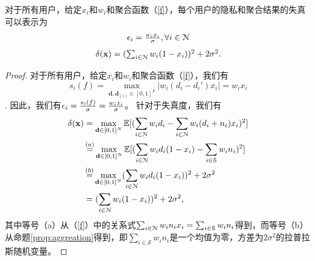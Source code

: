 	\begin{pp}[隐私-失真度]\label{prop:distortion}
		对于所有用户，给定$x_i$和$w_i$和聚合函数（\ref{f}），每个用户的隐私和聚合结果的失真可以表示为
		\begin{equation}\label{eq:e}
		\begin{array}
		[c]{lll}%
		\e_i=\frac{w_ix_i}{\sigma}, \forall i\in\N
		\end{array}
		\end{equation}
		\begin{equation}\label{eq:delta}
		\begin{array}
		[c]{lll}%
		\delta(\mathbf{x})=(\sum_{i\in\N}w_i(1-x_i))^2+2\sigma^2.
		\end{array}
		\end{equation}
	\end{pp}
	\begin{proof}
		对于所有用户，给定$x_i$和$w_i$和聚合函数（\ref{f}），我们有
		\[s_i(f)=\max_{\mathbf{d},\mathbf{d}_{(i)}\in[0,1]^S}|w_i(d_i-d_i')x_i|=w_ix_i\].
		因此，我们有$\epsilon_i=\frac{s_i(f)}{\sigma}=\frac{w_ix_i}{\sigma}$。
		针对于失真度，我们有
		\begin{align*}
		\delta(\mathbf{x})&=\max\limits_{\mathbf{d}\in[0,1]^N}\mathbb{E}[(\sum\limits_{i\in\mathcal{N}}w_id_i-\sum\limits_{i\in\mathcal{N}}w_i(d_i+n_i)x_i)^2]\\
		&\mathop{=}\limits^{(a)}\max\limits_{\mathbf{d}\in[0,1]^N}\mathbb{E}[(\sum\limits_{i\in\mathcal{N}}w_id_i(1-x_i)-\sum\limits_{i\in\mathcal{S}}w_in_i)^2]\\
		&\mathop{=}\limits^{(b)}\max\limits_{\mathbf{d}\in[0,1]^N}(\sum\limits_{i\in\mathcal{N}}w_id_i(1-x_i))^2+2\sigma^2\\
		&=(\sum\limits_{i\in\mathcal{N}}w_i(1-x_i))^2+2\sigma^2,
		\end{align*}
		其中等号（a）从（\ref{f}）中的关系式$\sum_{i\in\mathcal{N}}w_in_ix_i=\sum_{i\in\mathcal{S}}w_in_i$得到，而等号（b）从命题\ref{prop:aggreation}得到，即$\sum_{i\in\mathcal{S}}w_in_i$是一个均值为零，方差为$2\sigma^2$的拉普拉斯随机变量。
	\end{proof} 
	
